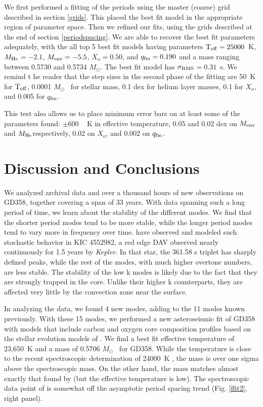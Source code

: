 \documentclass[12pt,preprint]{aastex}
\newcommand{\sigrms}{$\sigma_{\rm RMS}$}
\newcommand{\menv}{$M_{\rm env}$}
\newcommand{\mhe}{$M_{\rm He}$}
\newcommand{\msun}{$M_\odot$}
\begin{document}
We first performed a fitting of the periods using the master (coarse) grid described in section \ref{grids}. This 
placed the best fit model in the appropriate region of parameter space. Then we refined our fits, using the grids 
described at the end of section \ref{periodspacing}. We are able to recover the best fit parameters adequately, with 
the all top 5 best fit models having parameters 
${\rm T_{eff}}=25000$~K, \mhe $=-2.1$, $M_{\rm env}=-5.5$, $X_o=0.50$, and $q_{\rm fm}=0.190$ and a 
mass ranging between  0.5730 and 0.5734 \msun. The best fit model has \sigrms $=0.31$~s. We remind t
he reader that the step sizes in the second phase of the fitting are 50~K for 
${\rm T_{eff}}$, 0.0001 \msun ~ for stellar mass, 0.1 dex for helium layer masses, 
0.1 for $X_o$, and 0.005 for $q_{\rm fm}$.

This test also allows us to place minimum error bars on at least some of the parameters found: $\pm 600$ ~ K in effective 
temperature, 0.05 and 0.02 dex on \menv and \mhe respectively, 0.02 on $X_o$, and 0.002 on $q_{\rm fm}$.


\section{Discussion and Conclusions}
\label{discussion}

We analyzed archival data and over a thousand hours of new observations on GD358, together covering a 
span of 33 years. With data spanning such a long period of time, we learn about the stability of the
different modes. We find that the shorter period modes tend to be more stable, while the longer period 
modes tend to vary more in frequency over time. \citet{Bell15} have observed and modeled such stochastic 
behavior in KIC 4552982, a red edge DAV observed nearly continuously for 1.5 years by \emph{Kepler}. 
In that star, the 361.58 s triplet has sharply defined peaks, while the rest of the modes, with much 
higher overtone numbers, are less stable. The stability of the low k modes is likely due to the fact 
that they are strongly trapped in the core. Unlike their higher k counterparts, they are affected very 
little by the convection zone near the surface.

In analyzing the data, we found 4 new modes, adding to the 11 modes known previously. With these 15 modes, 
we performed a new asteroseismic fit of GD358 with models that include carbon and oxygen core composition 
profiles based on the stellar evolution models of \citet{Salaris97}. We find a best fit effective temperature 
of 23,650~K and a mass of 0.5706 \msun ~ for GD358. While the temperature is close to the recent spectroscopic 
determination of 24000~K \citep{Koester2013}, the mass is over one sigma above the spectroscopic mass. On the 
other hand, the mass matches almost exactly that found by \citet{Bergeron2011} (but the effective 
temperature is low). The spectroscopic data point of \citet{Koester2013} is somewhat off the asymptotic 
period spacing trend (Fig. \ref{ffit2}, right panel).
\end{document}
